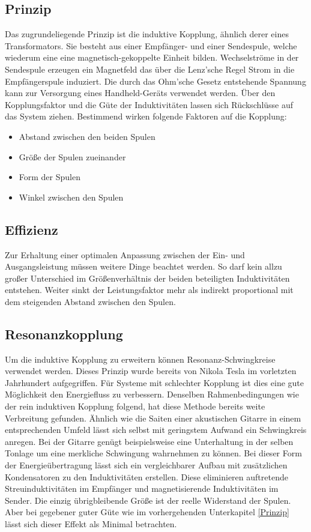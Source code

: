 \documentclass[12pt]{scrreprt} %
\begin{document}
\subsection{Prinzip}
\label{Prinzip}
Das zugrundeliegende Prinzip ist die induktive Kopplung, ähnlich derer eines Transformators. Sie besteht aus einer Empfänger- und einer Sendespule, welche wiederum eine eine magnetisch-gekoppelte Einheit bilden. Wechselströme in der Sendespule erzeugen ein Magnetfeld das über die Lenz'sche Regel Strom in die Empfängerspule induziert. Die durch das Ohm'sche Gesetz entstehende Spannung kann zur Versorgung eines Handheld-Geräts verwendet werden. Über den Kopplungsfaktor und die Güte der Induktivitäten lassen sich Rückschlüsse auf das System ziehen. Bestimmend wirken folgende Faktoren auf die Kopplung:
\begin{itemize}
\item
Abstand zwischen den beiden Spulen
\item
Größe der Spulen zueinander
\item
Form der Spulen
\item
Winkel zwischen den Spulen
\end{itemize}
\subsection{Effizienz}
Zur Erhaltung einer optimalen Anpassung zwischen der Ein- und Ausgangsleistung müssen weitere Dinge beachtet werden. So darf kein allzu großer Unterschied im Größenverhältnis der beiden beteiligten Induktivitäten entstehen. Weiter sinkt der Leistungsfaktor mehr als indirekt proportional mit dem steigenden Abstand zwischen den Spulen. 
\subsection{Resonanzkopplung}
Um die induktive Kopplung zu erweitern können Resonanz-Schwingkreise verwendet werden. Dieses Prinzip wurde bereits von Nikola Tesla im vorletzten Jahrhundert aufgegriffen. Für Systeme mit schlechter Kopplung ist dies eine gute Möglichkeit den Energiefluss zu verbessern. Denselben Rahmenbedingungen wie der rein induktiven Kopplung folgend, hat diese Methode bereits weite Verbreitung gefunden. Ähnlich wie die Saiten einer akustischen Gitarre in einem entsprechenden Umfeld lässt sich selbst mit geringstem Aufwand ein Schwingkreis anregen. Bei der Gitarre genügt beispielsweise eine Unterhaltung in der selben Tonlage um eine merkliche Schwingung wahrnehmen zu können. Bei dieser Form der Energieübertragung lässt sich ein vergleichbarer Aufbau mit zusätzlichen Kondensatoren zu den Induktivitäten erstellen. Diese eliminieren auftretende Streuinduktivitäten im Empfänger und magnetisierende Induktivitäten im Sender. Die einzig übrigbleibende Größe ist der reelle Widerstand der Spulen. Aber bei gegebener guter Güte wie im vorhergehenden Unterkapitel \vref{Prinzip} lässt sich dieser Effekt als Minimal betrachten. 
\end{document}

